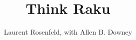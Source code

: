 \documentclass[10pt]{book}
\title{Think Raku}
\author{Laurent Rosenfeld, with Allen B. Downey }
\newif\ifplastex
\begin{document}
\frontmatter

\ifplastex
    \usepackage{localdef}
    \maketitle

\newcount\anchorcnt
\newcommand*{\Anchor}[1]{%
  \@bsphack%
    \Hy@GlobalStepCount\anchorcnt%
    \edef\@currentHref{anchor.\the\anchorcnt}%
    \Hy@raisedlink{\hyper@anchorstart{\@currentHref}\hyper@anchorend}%
    \M@gettitle{}\label{#1}%
    \@esphack%
}


\else

\newtheorem{exercise}{Exercise}[chapter]



\end{document}
